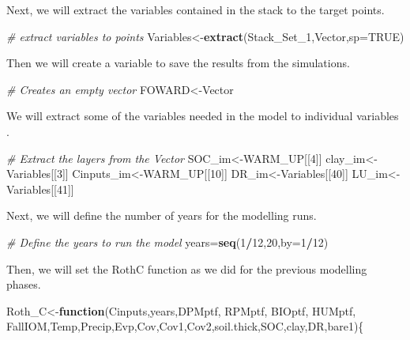 \documentclass[
  10pt,
  b5paper,
]{book}
\newenvironment{Shaded}{\begin{snugshade}}{\end{snugshade}}
\newcommand{\CommentTok}[1]{\textcolor[rgb]{0.56,0.35,0.01}{\textit{#1}}}
\newcommand{\ControlFlowTok}[1]{\textcolor[rgb]{0.13,0.29,0.53}{\textbf{#1}}}
\newcommand{\DataTypeTok}[1]{\textcolor[rgb]{0.13,0.29,0.53}{#1}}
\newcommand{\DecValTok}[1]{\textcolor[rgb]{0.00,0.00,0.81}{#1}}
\newcommand{\KeywordTok}[1]{\textcolor[rgb]{0.13,0.29,0.53}{\textbf{#1}}}
\newcommand{\NormalTok}[1]{#1}
\newcommand{\OperatorTok}[1]{\textcolor[rgb]{0.81,0.36,0.00}{\textbf{#1}}}
\newcommand{\OtherTok}[1]{\textcolor[rgb]{0.56,0.35,0.01}{#1}}
\begin{document}
Next, we will extract the variables contained in the stack to the target points.

\begin{Shaded}
\begin{Highlighting}[]
\CommentTok{# extract variables to points}
\NormalTok{Variables<-}\KeywordTok{extract}\NormalTok{(Stack_Set_}\DecValTok{1}\NormalTok{,Vector,}\DataTypeTok{sp=}\OtherTok{TRUE}\NormalTok{)}
\end{Highlighting}
\end{Shaded}

Then we will create a variable to save the results from the simulations.

\begin{Shaded}
\begin{Highlighting}[]
\CommentTok{# Creates an empty vector}
\NormalTok{FOWARD<-Vector}
\end{Highlighting}
\end{Shaded}

We will extract some of the variables needed in the model to individual variables .

\begin{Shaded}
\begin{Highlighting}[]
\CommentTok{# Extract the layers from the Vector}
\NormalTok{SOC_im<-WARM_UP[[}\DecValTok{4}\NormalTok{]]}
\NormalTok{clay_im<-Variables[[}\DecValTok{3}\NormalTok{]] }
\NormalTok{Cinputs_im<-WARM_UP[[}\DecValTok{10}\NormalTok{]] }
\NormalTok{DR_im<-Variables[[}\DecValTok{40}\NormalTok{]]}
\NormalTok{LU_im<-Variables[[}\DecValTok{41}\NormalTok{]]}
\end{Highlighting}
\end{Shaded}

Next, we will define the number of years for the modelling runs.

\begin{Shaded}
\begin{Highlighting}[]
\CommentTok{# Define the years to run the model}
\NormalTok{years=}\KeywordTok{seq}\NormalTok{(}\DecValTok{1}\OperatorTok{/}\DecValTok{12}\NormalTok{,}\DecValTok{20}\NormalTok{,}\DataTypeTok{by=}\DecValTok{1}\OperatorTok{/}\DecValTok{12}\NormalTok{)}
\end{Highlighting}
\end{Shaded}

Then, we will set the RothC function as we did for the previous modelling phases.

\begin{Shaded}
\begin{Highlighting}[]
\NormalTok{Roth_C<-}\ControlFlowTok{function}\NormalTok{(Cinputs,years,DPMptf, RPMptf, BIOptf, HUMptf, FallIOM,Temp,Precip,Evp,Cov,Cov1,Cov2,soil.thick,SOC,clay,DR,bare1)\{}
\end{Highlighting}
\end{Shaded}
\end{document}
